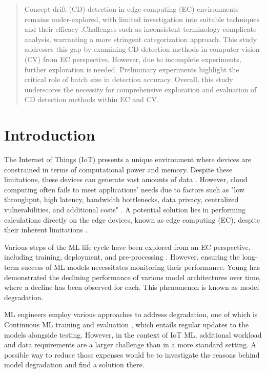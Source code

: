 \documentclass[a4paper]{article}
\begin{document}

\newpage


\begin{abstract} %
Concept drift (CD) detection in edge computing (EC) environments remains under-explored, with limited investigation into suitable techniques and their efficacy .Challenges such as inconsistent terminology complicate analysis, warranting a more stringent categorization approach. This study addresses this gap by examining CD detection methods in computer vision (CV) from EC perspective. However, due to incomplete experiments, further exploration is needed. Preliminary experiments highlight the critical role of batch size in detection accuracy. Overall, this study underscores the necessity for comprehensive exploration and evaluation of CD detection methods within EC and CV.
\end{abstract} 

\section{Introduction}
\label{sec:introduction}

The Internet of Things (IoT) presents a unique environment where devices are constrained in terms of computational power and memory. Despite these limitations, these devices can generate vast amounts of data \cite{merenda_edge_2020}. However, cloud computing often fails to meet applications' needs due to factors such as "low throughput, high latency, bandwidth bottlenecks, data privacy, centralized vulnerabilities, and additional costs" \cite{hua_edge_2023}. A potential solution lies in performing calculations directly on the edge devices, known as edge computing (EC), despite their inherent limitations \cite{hua_edge_2023}. 

Various steps of the ML life cycle have been explored from an EC perspective, including training, deployment, and pre-processing \cite{khouas_training_2024}\cite{murshed_machine_2021}\cite{ghosh_edge-cloud_2021}. However, ensuring the long-term success of ML models necessitates monitoring their performance. Young \cite{young_empirical_2022} has demonstrated the declining performance of various model architectures over time, where a decline has been observed for each. This phenomenon is known as model degradation.

ML engineers employ various approaches to address degradation, one of which is Continuous ML training and evaluation \cite{kreuzberger_machine_2023}, which entails regular updates to the models alongside testing. However, in the context of IoT ML, additional workload and data requirements are a larger challenge than in a more standard setting. A possible way to reduce those expenses would be to investigate the reasons behind model degradation and find a solution there.
\end{document}
